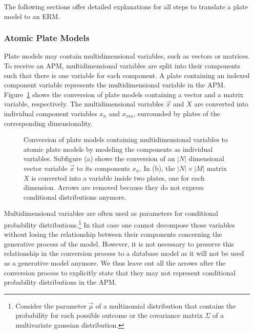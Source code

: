 The following sections offer detailed explanations for all steps to translate a plate model to an ERM.

\subsubsection{Atomic Plate Models}

Plate models may contain multidimensional variables, such as vectors or matrices. To receive an APM, multidimensional variables are split into their components such that there is one variable for each component. A plate containing an indexed component variable represents the multidimensional variable in the APM. Figure~\ref{fig:pm2apm} shows the conversion of plate models containing a vector and a matrix variable, respectively. The multidimensional variables $\vec x$ and $X$ are converted into individual component variables $x_n$ and $x_{nm}$, surrounded by plates of the corresponding dimensionality.

\begin{figure}[t]
\centering
\scalebox{\tikzScale}{\adjustTikzSize }
\caption{Conversion of plate models containing multidimensional variables to atomic plate models by modeling the components as individual variables. Subfigure (a) shows the conversion of an $|N|$ dimensional vector variable $\vec x$ to its components $x_n$. In (b), the $|N| \times |M|$ matrix $X$ is converted into a variable inside two plates, one for each dimension. Arrows are removed because they do not express conditional distributions anymore.}\label{fig:pm2apm}
\end{figure}


Multidimensional variables are often used as parameters for conditional probability distributions.\footnote{Consider the parameter $\vec \mu$ of a multinomial distribution that contains the probability for each possible outcome or the covariance matrix $\Sigma$ of a multivariate gaussian distribution.} In that case one cannot decompose those variables without losing the relationship between their components concerning the generative process of the model. However, it is not necessary to preserve this relationship in the conversion process to a database model as it will not be used as a generative model anymore. We thus leave out all the arrows after the conversion process to explicitly state that they may not represent conditional probability distributions in the APM.

